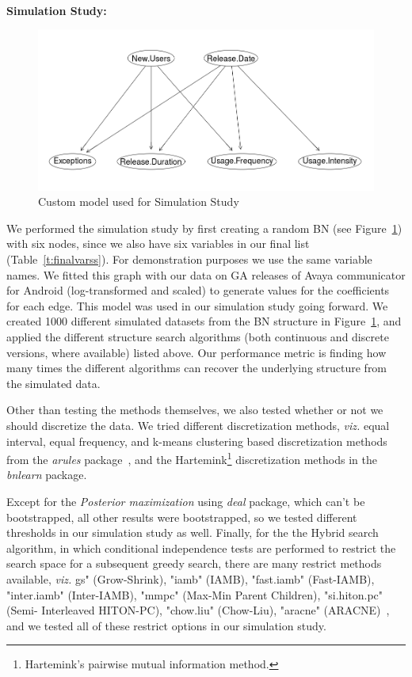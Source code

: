 \documentclass[smallcondensed]{svjour3}     %
\begin{document}
\noindent\\
\textbf{Simulation Study:}\\
\begin{figure}
\centering
\includegraphics[width=0.65\linewidth]{custom}
\caption{Custom model used for Simulation Study}
\label{fig:theory}
\vspace{-15pt}
\end{figure}
We performed the simulation study by first creating 
a random BN (see Figure~\ref{fig:theory}) with 
six nodes, since we also have six variables in our final list (Table~\ref{t:finalvarss}).
For demonstration purposes  we use the same variable names. 
We fitted this graph with our data on GA releases of Avaya communicator for Android
 (log-transformed and scaled) to generate values for the coefficients 
for each edge. This model was used in our simulation study going forward.
We created 1000 different simulated datasets from the BN structure in Figure~\ref{fig:theory},
and applied the different structure search algorithms 
(both continuous and discrete versions, where available) listed above. Our performance metric
is finding how many times the different algorithms can recover the 
underlying structure from the simulated data. 

Other than testing the methods  themselves, we also tested whether or not we should 
discretize the data. We tried different discretization methods, \textit{viz.} 
equal interval, equal frequency, and
k-means clustering based discretization methods from the
\textit{arules} package~\cite{arulesR}, and the 
Hartemink\footnote{Hartemink's pairwise mutual information 
method\cite{hartemink2001principled}.} discretization methods 
in the \textit{bnlearn} package.

Except for the \textit{Posterior maximization} using \textit{deal} package, which can't be bootstrapped, 
all other results were bootstrapped, so we tested different thresholds in our 
simulation study as well. Finally, for the the Hybrid search algorithm, in which
conditional independence tests are performed to restrict
the search space for a subsequent greedy search, there are many restrict methods
available, \textit{viz.} gs" (Grow-Shrink), "iamb" (IAMB), "fast.iamb" (Fast-IAMB), "inter.iamb" (Inter-IAMB), "mmpc" (Max-Min Parent Children), "si.hiton.pc" (Semi- Interleaved HITON-PC), "chow.liu" (Chow-Liu), "aracne" (ARACNE)~\cite{bnlearnR}, and we tested all of these restrict options 
in our simulation study. 
\end{document}
